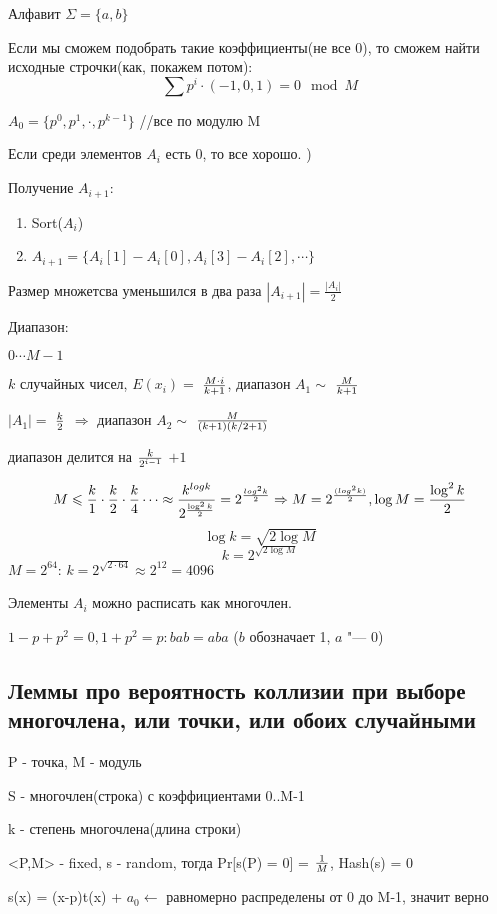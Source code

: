 Алфавит $\Sigma = \{a,b\}$ 

Если мы сможем подобрать такие коэффициенты(не все 0), то сможем найти исходные строчки(как, покажем потом):
$$\sum p^i \cdot (-1,0,1) = 0 \mod M$$

$A_0 = \{p^0, p^1, \cdot ,p^{k-1}\}$  //все по модулю M 

Если среди элементов $A_i$ есть 0, то все хорошо. )

Получение $A_{i+1}: $ 
\begin{enumerate} 
 \item Sort($A_i$) 
 \item $A_{i+1} = \{A_i[1]-A_i[0], A_i[3] - A_i[2], \cdots \}$
\end{enumerate}
  
Размер множетсва уменьшился в два раза $|A_{i+1}| = \frac{|A_i|}{2}$

Диапазон:
\begin{description}{
    \item [$A_0$:] $0 \cdots M-1$ 
    \item [$A_1$:] $k$ случайных чисел, $E(x_i)=$ $M \cdot i\over{k+1}$, диапазон $A_1 \sim$  $M\over{k+1}$ 
    \item [$A_2$:] $|A_1| =$ $k\over{2}$ $\Rightarrow$ диапазон $A_2 \sim$ $M\over{(k+1)(k/2 + 1)}$ 
    \item [$A_i$:] диапазон делится на $k\over{2^{i-1}}$ $+ 1$ 
}
\end{description}

$$M \leqslant \frac{k}{1} \cdot \frac{k}{2} \cdot \frac{k}{4} \cdots \approx \frac{k^{log k}}{2^{\frac{\log^2 k}{2}}} =
 2^{\frac{log^2 k}{2}} \Rightarrow M = 2^{({log^2 k})\over{2}}, \log M = \frac{{\log^2 k}}{2}$$
$$\log k = \sqrt{2 \log M}$$
$$k = 2^{\sqrt{2\log M}}$$
$M = 2^{64}$: $k = 2^{\sqrt{2 \cdot 64}} \approx 2^{12} = 4096$ 
\begin{exmp}
Элементы $A_i$ можно расписать как многочлен.

$1 - p + p^2 = 0, 1 + p^2 = p\colon bab = aba$ ($b$ обозначает 1, $a$ "--- 0)
\end{exmp}
\subsection{Леммы
про вероятность коллизии при выборе многочлена, или точки, или обоих случайными} 	

P - точка, M - модуль

S - многочлен(строка) с коэффициентами 0..M-1

k - степень многочлена(длина строки) 
\begin{lemma}{}
 <P,M> - fixed, s - random, тогда Pr[s(P) = 0] = ${1}\over{M}$, Hash(s) = 0

s(x) = (x-p)t(x) + $a_0 \leftarrow$ равномерно распределены от 0 до M-1, значит верно
\end{lemma}


